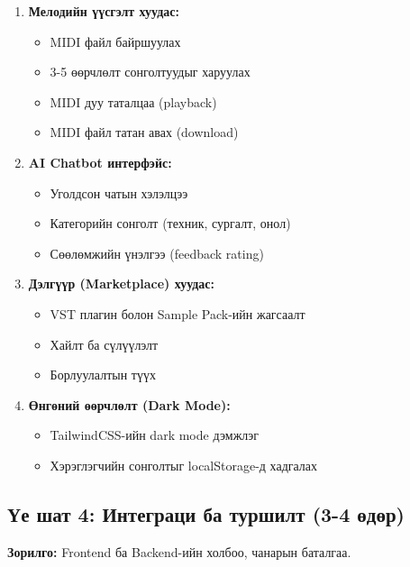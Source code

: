 \begin{enumerate}
    \item \textbf{Мелодийн үүсгэлт хуудас:}
    \begin{itemize}
        \item MIDI файл байршуулах
        \item 3-5 өөрчлөлт сонголтуудыг харуулах
        \item MIDI дуу таталцаа (playback)
        \item MIDI файл татан авах (download)
    \end{itemize}
    
    \item \textbf{AI Chatbot интерфэйс:}
    \begin{itemize}
        \item Уголдсон чатын хэлэлцээ
        \item Категорийн сонголт (техник, сургалт, онол)
        \item Сөөлөмжийн үнэлгээ (feedback rating)
    \end{itemize}
    
    \item \textbf{Дэлгүүр (Marketplace) хуудас:}
    \begin{itemize}
        \item VST плагин болон Sample Pack-ийн жагсаалт
        \item Хайлт ба сүлүүлэлт
        \item Борлуулалтын түүх
    \end{itemize}
    
    \item \textbf{Өнгөний өөрчлөлт (Dark Mode):}
    \begin{itemize}
        \item TailwindCSS-ийн dark mode дэмжлэг
        \item Хэрэглэгчийн сонголтыг localStorage-д хадгалах
    \end{itemize}
\end{enumerate}

\subsection{Үе шат 4: Интеграци ба туршилт (3-4 өдөр)}

\textbf{Зорилго:} Frontend ба Backend-ийн холбоо, чанарын баталгаа.

